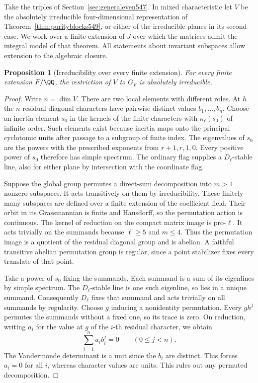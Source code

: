 \documentclass[a4paper,11pt]{article}
\newtheorem{proposition}{Proposition}[section]
\theoremstyle{definition}
\theoremstyle{remark}
\numberwithin{equation}{section}
\begin{document}
Take the triples of Section~\ref{sec:generaleven547}. In mixed
characteristic let \(V\) be the absolutely irreducible four-dimensional
representation of Theorem~\ref{thm:purityblocks549}, or either of
the irreducible planes in its second case. We work over a finite
extension of \(J\) over which the matrices admit the integral
model of that theorem. All statements about invariant subspaces
allow extension to the algebraic closure.

\begin{proposition}[Irreducibility over every finite extension]
\leavevmode\label{prop:strongall559}
For every finite extension \(F/\QQ\), the restriction of \(V\)
to \(G_F\) is absolutely irreducible.
\end{proposition}
\begin{proof}
Write \(n=\dim V\). There are two local elements with different
roles. At \(h\) the \(n\) residual diagonal characters have
pairwise distinct values \(b_1,\ldots,b_n\). Choose an inertia
element \(s_0\) in the kernels of the finite characters with
\(\kappa_\ell(s_0)\) of infinite order. Such elements exist
because inertia maps onto the principal cyclotomic units after
passage to a subgroup of finite index. The eigenvalues of
\(s_0\) are the powers with the prescribed exponents from
\(r+1,r,1,0\). Every positive power of \(s_0\) therefore has
simple spectrum. The ordinary flag supplies a \(D_\ell\)-stable
line, also for either plane by intersection with the coordinate
flag.

Suppose the global group permutes a direct-sum decomposition
into \(m>1\) nonzero subspaces. It acts transitively on them by
irreducibility. These finitely many subspaces are defined over
a finite extension of the coefficient field. Their orbit in its
Grassmannian is finite and Hausdorff, so the permutation action
is continuous. The kernel of reduction on the compact matrix
image is pro-\(\ell\). It acts trivially on the summands because
\(\ell\ge5\) and \(m\le4\). Thus the permutation image is a
quotient of the residual diagonal group and is abelian. A faithful
transitive abelian permutation group is regular, since a point
stabilizer fixes every translate of that point.

Take a power of \(s_0\) fixing the summands. Each summand is a
sum of its eigenlines by simple spectrum. The \(D_\ell\)-stable
line is one such eigenline, so lies in a unique summand.
Consequently \(D_\ell\) fixes that summand and acts trivially on
all summands by regularity. Choose \(g\) inducing a nonidentity
permutation. Every \(gh^j\) permutes the summands without a fixed
one, so its trace is zero. On reduction, writing \(a_i\) for the
value at \(g\) of the \(i\)-th residual character, we obtain
\[
                  \sum_{i=1}^n a_i b_i^j=0
                         \qquad(0\le j<n).
\]
The Vandermonde determinant is a unit since the \(b_i\) are
distinct. This forces \(a_i=0\) for all \(i\), whereas character
values are units. This rules out any permuted decomposition.


\end{proof}
\end{document}
